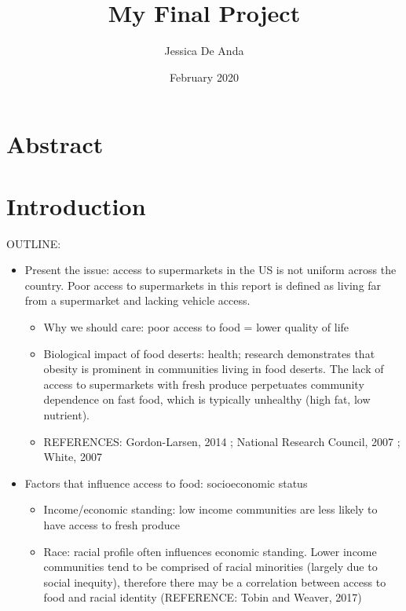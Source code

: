 \documentclass[letterpaper]{article} %
\title{My Final Project}
\author{Jessica De Anda}
\date{February 2020}
\begin{document}
\maketitle
\section*{Abstract}

\newpage
\tableofcontents
\listoffigures

\newpage
\section{Introduction}

OUTLINE:

\begin{itemize} \itemsep -.1cm
	\item Present the issue: access to supermarkets in the US is not uniform across the country. Poor access to supermarkets in this report is defined as living far from a supermarket and lacking vehicle access.
		\begin{itemize}\itemsep -.1cm\vspace{-.25cm}
			\item Why we should care: poor access to food = lower quality of life
			\item Biological impact of food deserts: health; research demonstrates that obesity is prominent in communities living in food deserts. The lack of access to supermarkets with fresh produce perpetuates community dependence on fast food, which is typically unhealthy (high fat, low nutrient).
			\item REFERENCES: Gordon-Larsen, 2014 ; National Research Council, 2007 ; White, 2007
		\end{itemize}
	\item Factors that influence access to food: socioeconomic status
		\begin{itemize}\itemsep -.1cm\vspace{-.25cm}
			\item Income/economic standing: low income communities are less likely to have access to fresh produce
			\item Race: racial profile often influences economic standing. Lower income communities tend to be comprised of racial minorities (largely due to social inequity), therefore there may be a correlation between access to food and racial identity (REFERENCE: Tobin and Weaver, 2017)

\end{itemize}
\end{itemize}
\end{document}
